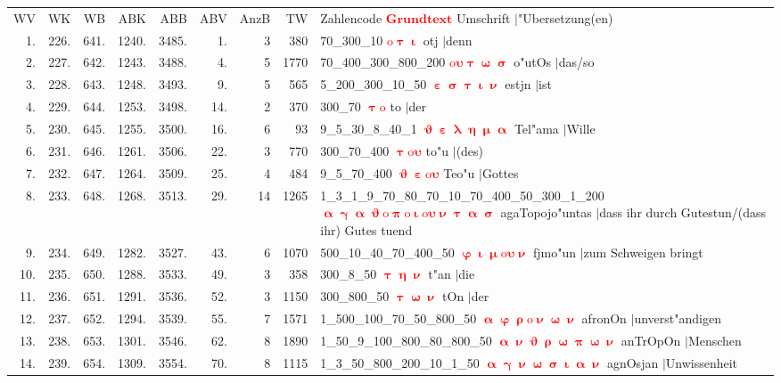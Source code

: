 \documentclass[a4paper,10pt,landscape]{article}
\begin{document}
\begin{tabular}{rrrrrrrrp{120mm}}
WV&WK&WB&ABK&ABB&ABV&AnzB&TW&Zahlencode \textcolor{red}{$\boldsymbol{Grundtext}$} Umschrift $|$"Ubersetzung(en)\\
1.&226.&641.&1240.&3485.&1.&3&380&70\_300\_10 \textcolor{red}{$\boldsymbol{\mathrm{o}\uptau\upiota}$} otj $|$denn\\
2.&227.&642.&1243.&3488.&4.&5&1770&70\_400\_300\_800\_200 \textcolor{red}{$\boldsymbol{\mathrm{o}\upsilon\uptau\upomega\upsigma}$} o"utOs $|$das/so\\
3.&228.&643.&1248.&3493.&9.&5&565&5\_200\_300\_10\_50 \textcolor{red}{$\boldsymbol{\upepsilon\upsigma\uptau\upiota\upnu}$} estjn $|$ist\\
4.&229.&644.&1253.&3498.&14.&2&370&300\_70 \textcolor{red}{$\boldsymbol{\uptau\mathrm{o}}$} to $|$der\\
5.&230.&645.&1255.&3500.&16.&6&93&9\_5\_30\_8\_40\_1 \textcolor{red}{$\boldsymbol{\upvartheta\upepsilon\uplambda\upeta\upmu\upalpha}$} Tel"ama $|$Wille\\
6.&231.&646.&1261.&3506.&22.&3&770&300\_70\_400 \textcolor{red}{$\boldsymbol{\uptau\mathrm{o}\upsilon}$} to"u $|$(des)\\
7.&232.&647.&1264.&3509.&25.&4&484&9\_5\_70\_400 \textcolor{red}{$\boldsymbol{\upvartheta\upepsilon\mathrm{o}\upsilon}$} Teo"u $|$Gottes\\
8.&233.&648.&1268.&3513.&29.&14&1265&1\_3\_1\_9\_70\_80\_70\_10\_70\_400\_50\_300\_1\_200 \textcolor{red}{$\boldsymbol{\upalpha\upgamma\upalpha\upvartheta\mathrm{o}\uppi\mathrm{o}\upiota\mathrm{o}\upsilon\upnu\uptau\upalpha\upsigma}$} agaTopojo"untas $|$dass ihr durch Gutestun/(dass ihr) Gutes tuend\\
9.&234.&649.&1282.&3527.&43.&6&1070&500\_10\_40\_70\_400\_50 \textcolor{red}{$\boldsymbol{\upvarphi\upiota\upmu\mathrm{o}\upsilon\upnu}$} fjmo"un $|$zum Schweigen bringt\\
10.&235.&650.&1288.&3533.&49.&3&358&300\_8\_50 \textcolor{red}{$\boldsymbol{\uptau\upeta\upnu}$} t"an $|$die\\
11.&236.&651.&1291.&3536.&52.&3&1150&300\_800\_50 \textcolor{red}{$\boldsymbol{\uptau\upomega\upnu}$} tOn $|$der\\
12.&237.&652.&1294.&3539.&55.&7&1571&1\_500\_100\_70\_50\_800\_50 \textcolor{red}{$\boldsymbol{\upalpha\upvarphi\uprho\mathrm{o}\upnu\upomega\upnu}$} afronOn $|$unverst"andigen\\
13.&238.&653.&1301.&3546.&62.&8&1890&1\_50\_9\_100\_800\_80\_800\_50 \textcolor{red}{$\boldsymbol{\upalpha\upnu\upvartheta\uprho\upomega\uppi\upomega\upnu}$} anTrOpOn $|$Menschen\\
14.&239.&654.&1309.&3554.&70.&8&1115&1\_3\_50\_800\_200\_10\_1\_50 \textcolor{red}{$\boldsymbol{\upalpha\upgamma\upnu\upomega\upsigma\upiota\upalpha\upnu}$} agnOsjan $|$Unwissenheit\\
\end{tabular}\medskip \\
\end{document}
